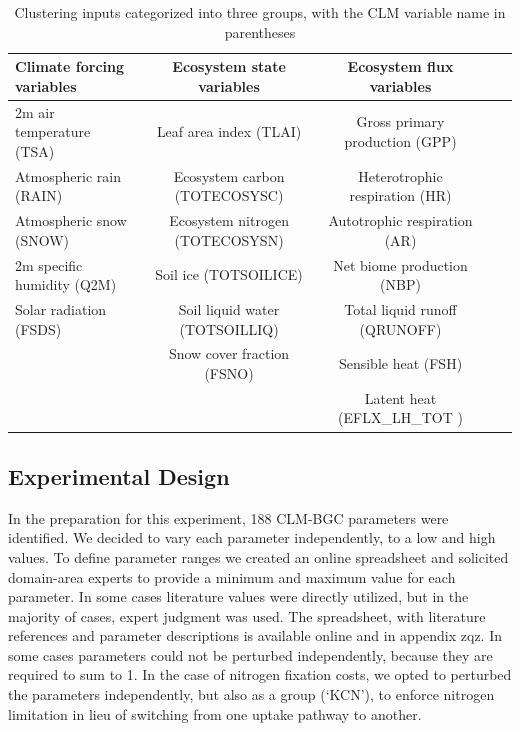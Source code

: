 \documentclass[draft]{agujournal2019}
\begin{document}
\begin{table}[h]
\caption{Clustering inputs categorized into three groups, with the CLM variable name in parentheses}
\centering
\begin{tabular}{l c c c c}
 \hline
 Climate forcing variables & Ecosystem state variables &Ecosystem flux variables \\
 \hline
 2m air temperature (TSA) & Leaf area index (TLAI) & Gross primary production (GPP) \\
Atmospheric rain (RAIN) & Ecosystem carbon (TOTECOSYSC) &Heterotrophic respiration (HR) \\
Atmospheric snow (SNOW) &  Ecosystem nitrogen (TOTECOSYSN) &Autotrophic respiration (AR) \\
2m specific humidity (Q2M) & Soil ice (TOTSOILICE) &Net biome production (NBP) \\
Solar radiation (FSDS) & Soil liquid water (TOTSOILLIQ) & Total liquid runoff (QRUNOFF) \\
& Snow cover fraction (FSNO) & Sensible heat  (FSH) \\
&&Latent heat (EFLX\_LH\_TOT ) \\
 \hline
 \end{tabular}
 \label{tab:sg}
 \end{table}


\subsection{Experimental Design}
In the preparation for this experiment, 188 CLM-BGC parameters were identified. We decided to vary each parameter independently, to a low and high values. To define parameter ranges we created an online spreadsheet and solicited domain-area experts to provide a minimum and maximum value for each parameter. In some cases literature values were directly utilized, but in the majority of cases, expert judgment was used. The spreadsheet, with literature references and parameter descriptions is available online and in appendix zqz. In some cases parameters could not be perturbed independently, because they are required to sum to 1. In the case of nitrogen fixation costs, we opted to perturbed the parameters independently, but also as a group (`KCN'), to enforce nitrogen limitation in lieu of switching from one uptake pathway to another.
\end{document}
